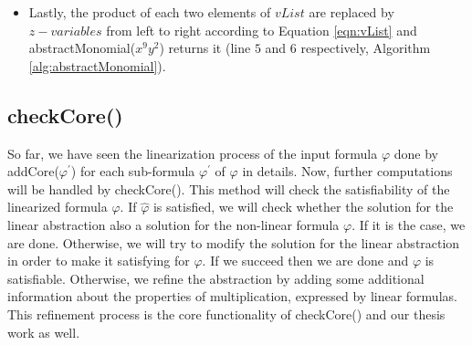 \begin{example}
\begin{itemize}
\tikzset{every picture/.style=remember picture}
\begin{figure}[H]
\centering
{}
\end{figure}

        \item Lastly, the product of each two elements of $vList$ are replaced by $z-variables$ from left to right according to Equation \ref{eqn:vList} and abstractMonomial($x^9y^2$) returns it (line $5$ and $6$ respectively, Algorithm \ref{alg:abstractMonomial}).
        
\tikzset{every picture/.style=remember picture}
\begin{figure}[H]
\centering
{}
\end{figure}

    \end{itemize}
\end{example}
\subsection{checkCore()}
\label{subsec:checkCore}
\begin{sloppypar}
So far, we have seen the linearization process of the input formula $\varphi$ done by addCore($\varphi^\prime$) for each sub-formula $\varphi^\prime$ of $\varphi$ in details.
Now, further computations will be handled by checkCore().
This method will check the satisfiability of the linearized formula $\hat{\varphi}$.
If $\hat{\varphi}$ is satisfied, we will check whether the solution for the linear abstraction also a solution for the non-linear formula $\varphi$.
If it is the case, we are done.
Otherwise, we will try to modify the solution for the linear abstraction in order to make it satisfying for $\varphi$.
If we succeed then we are done and $\varphi$ is satisfiable.
Otherwise, we refine the abstraction by adding some additional information about the properties of multiplication, expressed by linear formulas.
This refinement process is the core functionality of checkCore() and our thesis work as well.\newline
\end{sloppypar}

